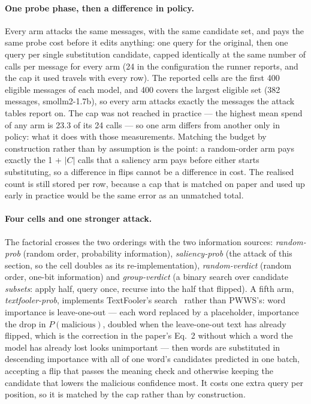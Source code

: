 \paragraph{One probe phase, then a difference in policy.} Every arm attacks the
same messages, with the same candidate set, and pays the same probe cost before
it edits anything: one query for the original, then one query per single
substitution candidate, capped identically at the same number of calls per
message for every arm (24 in the configuration the runner reports, and the cap it
used travels with every row). The reported cells are the first 400 eligible
messages of each model, and 400 covers the largest eligible set (382 messages,
smollm2-1.7b), so every arm attacks exactly the messages the attack tables
report on. The cap was not reached in practice --- the highest mean spend of any
arm is 23.3 of its 24 calls --- so one arm differs from another only in policy:
what it does with those measurements. Matching the budget by construction rather
than by assumption
is the point: a random-order arm pays exactly the 1 + $|C|$ calls that a saliency
arm pays before either starts substituting, so a difference in flips cannot be a
difference in cost. The realised count is still stored per row, because a cap
that is matched on paper and used up early in practice would be the same error as
an unmatched total.

\paragraph{Four cells and one stronger attack.} The factorial crosses the two
orderings with the two information sources:
\emph{random-prob} (random order, probability information),
\emph{saliency-prob} (the attack of this section, so the cell doubles as its
re-implementation), \emph{random-verdict} (random order, one-bit information) and
\emph{group-verdict} (a binary search over candidate \emph{subsets}: apply half,
query once, recurse into the half that flipped). A fifth arm,
\emph{textfooler-prob}, implements TextFooler's search~\cite{jin2020textfooler}
rather than PWWS's: word importance is leave-one-out --- each word replaced by a
placeholder, importance the drop in $P(\text{malicious})$, doubled when the
leave-one-out text has already flipped, which is the correction in the paper's
Eq.~2 without which a word the model has already lost looks unimportant --- then
words are substituted in descending importance with all of one word's candidates
predicted in one batch, accepting a flip that passes the meaning check and
otherwise keeping the candidate that lowers the malicious confidence most. It
costs one extra query per position, so it is matched by the cap rather than by
construction.


